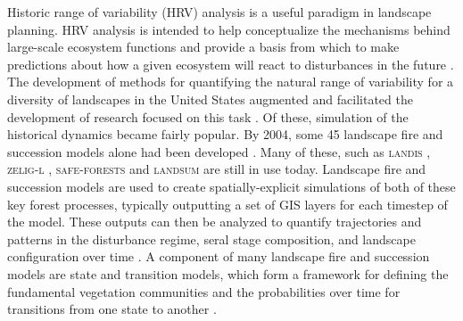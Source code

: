 Historic range of variability (HRV) analysis is a useful paradigm in landscape planning. HRV analysis is intended to help conceptualize the mechanisms behind large-scale ecosystem functions and provide a basis from which to make predictions about how a given ecosystem will react to disturbances in the future \citep{Landres1999,Nonaka2005}. The development of methods for quantifying the natural range of variability for a diversity of landscapes in the United States augmented and facilitated the development of research focused on this task \citep{Landres1999}. Of these, simulation of the historical dynamics became fairly popular. By 2004, some 45 landscape fire and succession models alone had been developed \citep{Keane2004}. Many of these, such as \textsc{landis} \citep{He1999}, \textsc{zelig-l} \citep{Miller1999}, \textsc{safe-forests} \citep{Sessions1997} and \textsc{landsum} \citep{Keane2012} are still in use today. Landscape fire and succession models are used to create spatially-explicit simulations of both of these key forest processes, typically outputting a set of GIS layers for each timestep of the model. These outputs can then be analyzed to quantify trajectories and patterns in the disturbance regime, seral stage composition, and landscape configuration over time \citep{Keane2004}. A component of many landscape fire and succession models are state and transition models, which form a framework for defining the fundamental vegetation communities and the probabilities over time for transitions from one state to another \citep{Stringham2003,Blankenship2015}.

